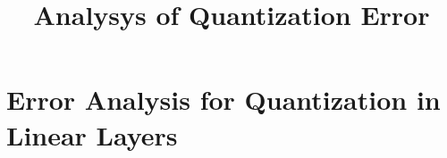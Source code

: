 \documentclass[11pt, a4paper]{article}
\title{
    \vspace{-1cm}
    {\LARGE Analysys of Quantization Error} \\[0.5em]
}
\begin{document}

\maketitle


\tableofcontents
\newpage







\section{Error Analysis for Quantization in Linear Layers}
\end{document}
